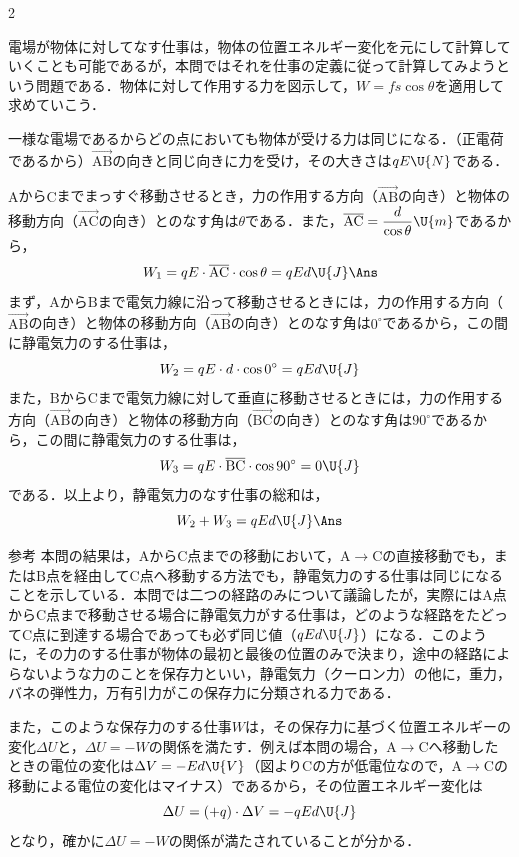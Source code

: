 \begin{multicols}{2}
\par\nopagebreak
\begin{sisin}
電場が物体に対してなす仕事は，物体の位置エネルギー変化を元にして計算していくことも可能であるが，本問ではそれを仕事の定義に従って計算してみようという問題である．物体に対して作用する力を図示して，$W=fs\cos\theta$を適用して求めていこう．
\end{sisin}
\KaiHead
一様な電場であるからどの点においても物体が受ける力は同じになる．（正電荷であるから）$\overrightarrow{\mathrm{AB}}$の向きと同じ向きに力を受け，その大きさは$qE\U{N}$である．
\begin{komon}
 $\mathrm{A}$から$\mathrm{C}$までまっすぐ移動させるとき，力の作用する方向（$\overrightarrow{\mathrm{AB}}$の向き）と物体の移動方向（$\overrightarrow{\mathrm{AC}}$の向き）とのなす角は$\theta$である．また，$\overline{\mathrm{AC}}=\dfrac{d}{\cos\theta}\U{m}$であるから，
       \[W_1=qE\cdot\overline{\mathrm{AC}}\cdot\cos\theta=qEd\U{J}\Ans\]
 まず，$\mathrm{A}$から$\mathrm{B}$まで電気力線に沿って移動させるときには，力の作用する方向（$\overrightarrow{\mathrm{AB}}$の向き）と物体の移動方向（$\overrightarrow{\mathrm{AB}}$の向き）とのなす角は$0^\circ$であるから，この間に静電気力のする仕事は，
       \[W_2=qE\cdot d\cdot\cos 0^\circ=qEd\U{J}\]
       また，$\mathrm{B}$から$\mathrm{C}$まで電気力線に対して垂直に移動させるときには，力の作用する方向（$\overrightarrow{\mathrm{AB}}$の向き）と物体の移動方向（$\overrightarrow{\mathrm{BC}}$の向き）とのなす角は$90^\circ$であるから，この間に静電気力のする仕事は，
       \[W_3=qE\cdot\overline{\mathrm{BC}}\cdot\cos 90^\circ=0\U{J}\]
       である．以上より，静電気力のなす仕事の総和は，
       \[W_2+W_3=qEd\U{J}\Ans\]
\end{komon}
\begin{bsHosoku}{参考}
本問の結果は，$\mathrm{A}$から$\mathrm{C}$点までの移動において，$\mathrm{A}\rightarrow\mathrm{C}$の直接移動でも，または$\mathrm{B}$点を経由して$\mathrm{C}$点へ移動する方法でも，静電気力のする仕事は同じになることを示している．本問では二つの経路のみについて議論したが，実際には$\mathrm{A}$点から$\mathrm{C}$点まで移動させる場合に静電気力がする仕事は，どのような経路をたどって$\mathrm{C}$点に到達する場合であっても必ず同じ値（$qEd\U{J}$）になる．このように，その力のする仕事が物体の最初と最後の位置のみで決まり，途中の経路によらないような力のことを{\gtfamily 保存力}といい，静電気力（クーロン力）の他に，重力，バネの弾性力，万有引力がこの保存力に分類される力である．

また，このような保存力のする仕事$W$は，その保存力に基づく位置エネルギーの変化$\Delta U$と，$\Delta U=-W$の関係を満たす．例えば本問の場合，$\mathrm{A}\rightarrow\mathrm{C}$へ移動したときの電位の変化は$\Delta V=-Ed\U{V}$（図より$\mathrm{C}$の方が低電位なので，$\mathrm{A}\rightarrow\mathrm{C}$の移動による電位の変化はマイナス）であるから，その位置エネルギー変化は
\[\Delta U=(+q)\cdot\Delta V=-qEd\U{J}\]
となり，確かに$\Delta U=-W$の関係が満たされていることが分かる．
\end{bsHosoku}


\end{multicols}
